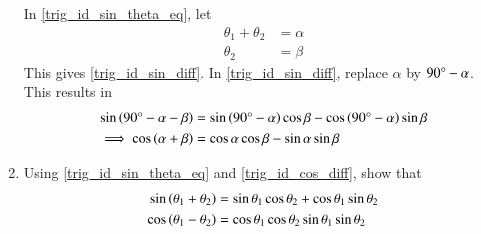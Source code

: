 \begin{enumerate}[label=\thesubsection.\arabic*.,ref=\thesubsection.\theenumi]
\begin{enumerate}
	\end{enumerate}

\solution In \eqref{trig_id_sin_theta_eq}, let
%
\begin{equation}
\begin{split}
\theta_1 + \theta_2 &= \alpha \\
\theta_2 &=  \beta
\end{split}
\end{equation}
%
This gives \eqref{trig_id_sin_diff}.  In \eqref{trig_id_sin_diff}, replace $\alpha$ by 
%
$90{\degree} - \alpha$.  This results in
%
\begin{align}
\sin\left(90{\degree} - \alpha - \beta\right)
	&=
\sin \left(90{\degree} -\alpha\right) \cos \beta - \cos \left(90{\degree} -\alpha\right) \sin \beta \\
	\implies \cos\left(\alpha + \beta\right) &= \cos \alpha \cos \beta - \sin \alpha \sin \beta
\end{align}
% 
\item
	Using \eqref{trig_id_sin_theta_eq} and \eqref{trig_id_cos_diff}, show that
\begin{align}
\label{trig_id_sin_sum}
\sin\left(\theta_1 + \theta_2\right) &= \sin\theta_1  \cos\theta_2 + \cos\theta_1\sin\theta_2
\\
\cos\left(\theta_1 - \theta_2\right) &= \cos\theta_1  \cos\theta_2  \sin\theta_1\sin\theta_2
\label{trig_id_cos_sum}
\end{align}


\end{enumerate}
